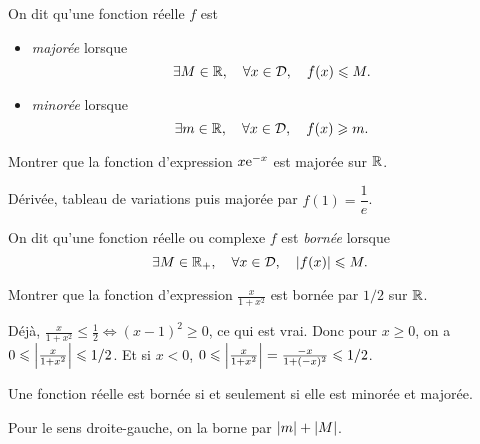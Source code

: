 \documentclass{magnolia}
\begin{document}
\begin{definition}[utile=-3]
On dit qu'une fonction réelle $f$ est
\begin{itemize}
\item \emph{majorée} lorsque
  \[\exists M\in\mathbb{R} ,\quad \forall x\in\mathcal{D} ,\quad
    f(x)\leqslant M.\]
\item \emph{minorée} lorsque
  \[\exists m\in\mathbb{R} ,\quad \forall x\in\mathcal{D} ,\quad
    f(x)\geqslant m.\]
\end{itemize}
\end{definition}

\begin{exoUnique}
\exo Montrer que la fonction d'expression $x {\rm e}^{-x}$ est majorée sur $\mathbb{R}$.
\end{exoUnique}

\begin{sol}
Dérivée, tableau de variations puis majorée par $f(1)=\dfrac{1}{e}$.
\end{sol}


\begin{definition}[utile=-3]
On dit qu'une fonction réelle ou complexe $f$ est \emph{bornée} lorsque
\[\exists M\in\mathbb{R}_+ ,\quad \forall x\in\mathcal{D} ,\quad
  \left|f(x)\right|\leqslant M.\]
\end{definition}

\begin{exoUnique}
\exo Montrer que la fonction d'expression $\frac{x}{1+x^2}$ est bornée par
  $1/2$ sur $\mathbb{R}$.
\end{exoUnique}

\begin{sol}
Déjà, $\frac{x}{1+x^2} \leq \frac{1}{2} \Longleftrightarrow (x-1)^2\geq 0$, ce qui est vrai.
Donc pour $x\geq 0$, on a $0\leqslant \left|\frac{x}{1+x^2}\right| \leqslant 1/2$. Et si $x<0$, $0\leqslant \left|\frac{x}{1+x^2}\right|=\frac{-x}{1+(-x)^2}\leqslant 1/2$.
\end{sol}

\begin{proposition}
Une fonction réelle est bornée si et seulement si elle est minorée et majorée.
\end{proposition}

\begin{preuve}
Pour le sens droite-gauche, on la borne par $\left|m\right|+\left|M\right|$.
\end{preuve}
\end{document}
